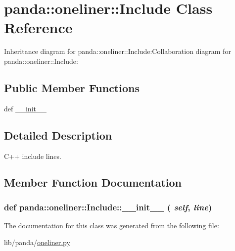 \hypertarget{classpanda_1_1oneliner_1_1Include}{
\section{panda::oneliner::Include Class Reference}
\label{classpanda_1_1oneliner_1_1Include}
}
Inheritance diagram for panda::oneliner::Include:Collaboration diagram for panda::oneliner::Include:\subsection*{Public Member Functions}
\begin{DoxyCompactItemize}
\item 
def \hyperlink{classpanda_1_1oneliner_1_1Include_a8129cb8a30bafec66b26eb3df925eca1}{\_\-\_\-init\_\-\_\-}
\end{DoxyCompactItemize}


\subsection{Detailed Description}
\begin{DoxyVerb}
C++ include lines.
\end{DoxyVerb}
 

\subsection{Member Function Documentation}
\hypertarget{classpanda_1_1oneliner_1_1Include_a8129cb8a30bafec66b26eb3df925eca1}{
\subsubsection[{\_\-\_\-init\_\-\_\-}]{\setlength{\rightskip}{0pt plus 5cm}def panda::oneliner::Include::\_\-\_\-init\_\-\_\- ( {\em self}, \/   {\em line})}}
\label{classpanda_1_1oneliner_1_1Include_a8129cb8a30bafec66b26eb3df925eca1}


The documentation for this class was generated from the following file:\begin{DoxyCompactItemize}
\item 
lib/panda/\hyperlink{oneliner_8py}{oneliner.py}\end{DoxyCompactItemize}
